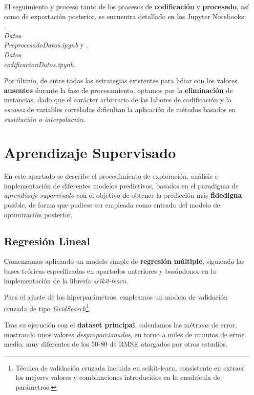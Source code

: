  El seguimiento y proceso tanto de los procesos de \textbf{codificación} y \textbf{procesado}, así como de exportación posterior, se encuentra detallado en los Jupyter Notebooks: \textit{.\\Datos\\PreprocesadoDatos.ipynb} y \textit{.\\Datos\\codificacionDatos.ipynb}.

Por último, de entre todas las estrategias\cite{Emmanuel2021ALearning} existentes para lidiar con los valores \textbf{ausentes} durante la fase de procesamiento, optamos por la \textbf{eliminación} de instancias, dado que el carácter arbitrario de las labores de codificación y la \textit{escasez} de variables correladas dificultan la aplicación de métodos basados en \textit{sustitución o interpolación}. 

\newpage

\section{Aprendizaje Supervisado}

En este apartado se describe el procedimiento de exploración, análisis e implementación de diferentes modelos predictivos, basados en el paradigma de \textit{aprendizaje supervisado} con el objetivo de obtener la predicción más \textbf{fidedigna} posible, de forma que pudiese ser empleada como entrada del modelo de optimización posterior.


\subsection{Regresión Lineal}

Comenzamos aplicando un modelo simple de \textbf{regresión múltiple}, siguiendo las bases teóricas especificadas en apartados anteriores y basándonos en la implementación de la librería \textit{scikit-learn}\cite{2021Scikit-LearnPython}.

Para el ajuste de los hiperparámetros, empleamos un modelo de validación cruzada de tipo \textit{GridSearch}\footnote{Técnica de validación cruzada incluida en scikit-learn, consistente en extraer los mejores valores y combinaciones introducidos en la cuadrícula de parámetros.}.

Tras su ejecución con el \textbf{dataset principal}, calculamos las métricas de error, mostrando unos valores \textit{desproporcionados}, en torno a miles de minutos de error medio, muy diferentes de los 50-80 de RMSE otorgados por otros estudios\cite{ShahabiKargar2014PredictingSurgery}.

